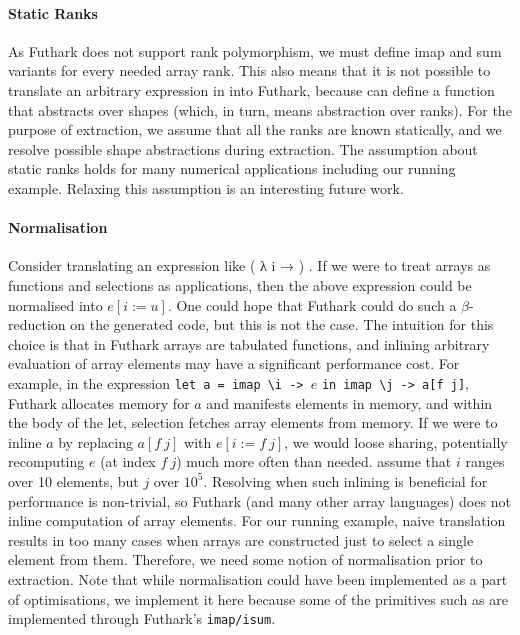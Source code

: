 \paragraph{Static Ranks} As Futhark does not support rank polymorphism,
we must define imap and sum variants for every needed array rank. This also means that
it is not possible to translate an arbitrary expression in  into
Futhark, because  can define a function that abstracts over shapes
(which, in turn, means abstraction over ranks).  For the purpose of
extraction, we assume that all the ranks are known statically, and we
resolve possible shape abstractions during extraction.  The assumption about
static ranks holds for many numerical applications including our
running example.  Relaxing this assumption is an interesting future work.

\paragraph{Normalisation} Consider translating an expression like
 ( λ i → ) .  If we were to treat arrays
as functions and selections as applications, then the above expression
could be normalised into $e[i := u]$.  One could hope that Futhark could do
such a $\beta$-reduction on the generated code, but this is not the case.
The intuition for this choice is that in Futhark arrays are tabulated
functions, and inlining arbitrary evaluation of array elements may
have a significant performance cost.  For example, in the expression
\texttt{let a = imap \textbackslash i -> }$e$ \texttt{in imap \textbackslash j -> a[f j]}, Futhark
allocates memory for $a$ and manifests elements in memory, and within the
body of the let, selection fetches array elements from memory.  If we were
to inline $a$ by replacing $a[f\ j]$ with $e[i := f\ j]$, we would loose sharing,
potentially recomputing $e$ (at index $f\ j$) much more often than needed.
\Eg{} assume that $i$ ranges over 10 elements, but $j$ over $10^5$.
Resolving when such inlining is beneficial for performance is non-trivial,
so Futhark (and many other array languages) does not inline 
computation of array elements.  For our running example, naive translation
results in too many cases when arrays are constructed just to select
a single element from them.  Therefore, we need some notion of normalisation
prior to extraction.  Note that while normalisation could have been
implemented as a part of optimisations, we implement it here because
some of the  primitives such as  are implemented
through Futhark's \texttt{imap/isum}. 


